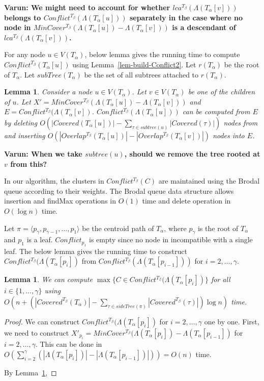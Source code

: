 \documentclass[final,1p,times]{elsarticle}
\newcommand{\leafset}{\Lambda}
\newcommand{\TA}{T_\alpha}
\newcommand{\TB}{T_\beta}
\newtheorem{lemma}[theorem]{Lemma}
\begin{document}
	{\bf Varun: We might need to account for whether $lca^{\TB}(\leafset(\TA[v]))$ belongs to $Conflict^{\TB}(\leafset(\TA[u]))$ separately in the case where no node in $MinCover^{T_{\beta}}(\Lambda(\TA[u])-\Lambda(\TA[v]))$ is a descendant of $lca^{\TB}(\leafset(\TA[v]))$.}

    For any node $u \in V(\TA)$, below lemma gives the running time to compute $Conflict^{\TB}(\TA[u])$ using Lemma~\ref{lem-build-Conflict2}.
    Let $r(T_{\alpha})$ be the root of $T_{\alpha}$. Let $subTree(T_{\alpha})$ be the set of all subtrees attached to $r(T_{\alpha})$.
    \begin{lemma}
	    \label{lem-time-build-Conflict2}
	    Consider a node $u \in V(\TA)$. Let $v \in V(\TA)$ be one of the children of $u$. Let $X'=MinCover^{T_{\beta}}(\Lambda(\TA[u])-\Lambda(\TA[v]))$ and $E = Conflict^{\TB}(\Lambda(\TA[v])$.
	    $Conflict^{\TB}(\Lambda(\TA[u]))$ can be computed from $E$ by deleting $O(|Covered(\TA[u])| - \sum_{\tau \in subtree(u)} |Covered(\tau)|)$ nodes from and inserting $O(|Overlap^{\TB}(\TA[u])| - |Overlap^{\TB}(\TA[v])|)$ nodes into $E$.
    \end{lemma}

	{\bf Varun: When we take $subtree(u)$, should we remove the tree rooted at $v$ from this?}

    In our algorithm, the clusters in $Conflict^{\TB}(C)$ are maintained using the Brodal queue according to their weights.
    The Brodal queue data structure allows insertion and findMax operations in $O(1)$ time and delete operation in $O(\log n)$ time.

    Let $\pi = \langle p_{\gamma}, p_{\gamma - 1}, \dots, p_1 \rangle$ be the centroid path of $\TA$, where $p_{\gamma}$ is the root of $\TA$ and $p_1$ is a leaf.
    $Conflict_{p_1}$ is empty since no node in incompatible with a single leaf.
    The below lemma gives the running time to construct $Conflict^{\TB}(\Lambda(\TA[p_i])$ from $Conflict^{\TB}(\Lambda(\TA[p_{i-1}]))$ for $i = 2, \ldots, \gamma$.
    \begin{lemma}
	    We can compute $\max \{ C \in Conflict^{\TB}(\Lambda(\TA[p_i]) \}$ for all $i \in \{1, \ldots, \gamma\}$
	    using $O\left(n + \left( |Covered^{\TB}(\TA)| - \sum_{\tau \in sideTree(\pi)} |Covered^{\TB}(\tau)| \right) \log n \right)$ time.
    \end{lemma}
    \begin{proof}
	    We can construct $Conflict^{\TB}(\Lambda(\TA[p_i])$ for $i = 2, \ldots, \gamma$ one by one.
	    First, we need to construct $X'_{p_i} = MinCover^{\TB}(\Lambda(\TA[p_i]) - \Lambda(\TA[p_{i-1}])$ for $i = 2, \ldots, \gamma$.
	    This can be done in $O( \sum_{i=2}^{\gamma} (|\Lambda(\TA[p_i])| - |\Lambda(\TA[p_{i-1}])|) ) = O(n)$ time.

	    By Lemma~\ref{lem-time-build-Conflict2},


    \end{proof}
\end{document}
